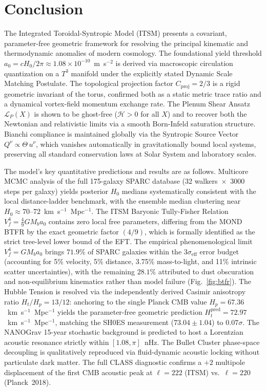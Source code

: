 \documentclass[aps,prd,10pt,twocolumn,superscriptaddress,nofootinbib,floatfix]{revtex4-2}
\begin{document}
\section{Conclusion}

The Integrated Toroidal-Syntropic Model (ITSM) presents a covariant, parameter-free geometric framework for resolving the principal kinematic and thermodynamic anomalies of modern cosmology. The foundational yield threshold $a_0 = cH_0/2\pi \approx 1.08 \times 10^{-10}$~m~s$^{-2}$ is derived via macroscopic circulation quantization on a $T^3$ manifold under the explicitly stated Dynamic Scale Matching Postulate. The topological projection factor $C_{\text{proj}} = 2/3$ is a rigid geometric invariant of the torus, confirmed both as a static metric trace ratio and a dynamical vortex-field momentum exchange rate. The Plenum Shear Ansatz $\mathcal{L}_P(X)$ is shown to be ghost-free ($\mathcal{H} > 0$ for all $X$) and to recover both the Newtonian and relativistic limits via a smooth Born-Infeld saturation structure. Bianchi compliance is maintained globally via the Syntropic Source Vector $Q^\nu \propto \Theta\,u^\nu$, which vanishes automatically in gravitationally bound local systems, preserving all standard conservation laws at Solar System and laboratory scales.

The model's key quantitative predictions and results are as follows. Multicore MCMC analysis of the full 175-galaxy SPARC database (32 walkers~$\times$~3000 steps per galaxy) yields posterior $H_0$ medians systematically consistent with the local distance-ladder benchmark, with the ensemble median clustering near $H_0 \approx 70$--$72$~km~s$^{-1}$~Mpc$^{-1}$. The ITSM Baryonic Tully-Fisher Relation $V_f^4 = \frac{4}{9}G M_b a_0$ contains zero local free parameters, differing from the MOND BTFR by the exact geometric factor $(4/9)$, which is formally identified as the strict tree-level lower bound of the EFT. The empirical phenomenological limit $V_f^4 = G M_b a_0$ brings $71.9\%$ of SPARC galaxies within the $3\sigma_{\text{eff}}$ error budget (accounting for 5\% velocity, 5\% distance, 3.75\% mass-to-light, and 11\% intrinsic scatter uncertainties), with the remaining $28.1\%$ attributed to dust obscuration and non-equilibrium kinematics rather than model failure (Fig.~\ref{fig:btfr}). The Hubble Tension is resolved via the independently derived Casimir anisotropy ratio $H_t/H_p = 13/12$: anchoring to the single Planck CMB value $H_p = 67.36$~km~s$^{-1}$~Mpc$^{-1}$ yields the parameter-free geometric prediction $H_t^{\text{pred}} = 72.97$~km~s$^{-1}$~Mpc$^{-1}$, matching the SH0ES measurement ($73.04 \pm 1.04$) to $0.07\sigma$. The NANOGrav 15-year stochastic background is predicted to host a Lorentzian acoustic resonance strictly within $[1.08, \pi]$~nHz. The Bullet Cluster phase-space decoupling is qualitatively reproduced via fluid-dynamic acoustic locking without particulate dark matter. The full CLASS diagnostic confirms a $+2$ multipole displacement of the first CMB acoustic peak at $\ell = 222$ (ITSM) vs.~$\ell = 220$ (Planck~2018).
\end{document}
